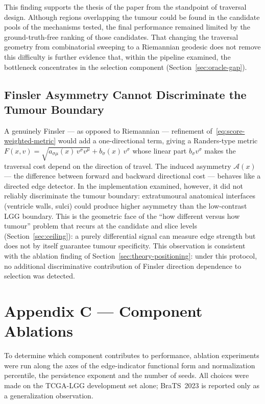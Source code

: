 \documentclass[11pt,a4paper]{article}
\begin{document}
This finding supports the thesis of the paper from the standpoint of traversal
design. Although regions overlapping the tumour could be found in the candidate
pools of the mechanisms tested, the final performance remained limited by the
ground-truth-free ranking of those candidates. That changing the traversal geometry
from combinatorial sweeping to a Riemannian geodesic does not remove this
difficulty is further evidence that, within the pipeline examined, the bottleneck
concentrates in the selection component (Section~\ref{sec:oracle-gap}).

\subsection{Finsler Asymmetry Cannot Discriminate the Tumour Boundary}\label{sec:geodesic-asymmetry}

A genuinely Finsler --- as opposed to Riemannian --- refinement
of~\eqref{eq:score-weighted-metric} would add a one-directional term, giving a
Randers-type metric~\cite{randers1941}
$F(x,v)=\sqrt{a_{\sigma\mu}(x)\,v^\sigma v^\mu}+b_\sigma(x)\,v^\sigma$ whose linear
part $b_\sigma v^\sigma$ makes the traversal cost depend on the direction of
travel. The induced asymmetry $\mathcal A(x)$ --- the difference between forward and
backward directional cost --- behaves like a directed edge detector. In the
implementation examined, however, it did not reliably discriminate the tumour
boundary: extratumoural anatomical interfaces (ventricle walls, sulci) could
produce higher asymmetry than the low-contrast LGG boundary. This is the geometric
face of the ``how different versus how tumour'' problem that recurs at the
candidate and slice levels (Section~\ref{sec:ceiling}): a purely differential
signal can measure edge strength but does not by itself guarantee tumour
specificity. This observation is consistent with the ablation finding of
Section~\ref{sec:theory-positioning}: under this protocol, no additional
discriminative contribution of Finsler direction dependence to selection was
detected.

\section{Appendix C --- Component Ablations}\label{sec:ablation}

To determine which component contributes to performance, ablation experiments were
run along the axes of the edge-indicator functional form and normalization
percentile, the persistence exponent and the number of seeds. All choices were made
on the TCGA-LGG development set alone; BraTS~2023 is reported only as a
generalization observation.
\end{document}
